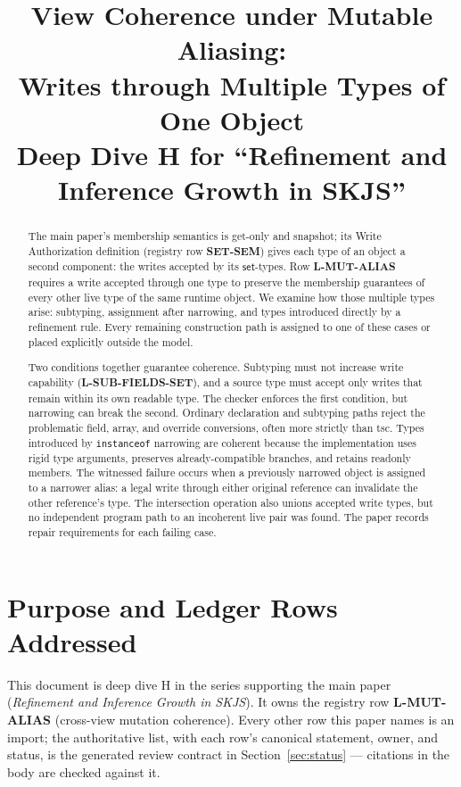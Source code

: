 \documentclass[11pt]{article}
\title{View Coherence under Mutable Aliasing:\\
Writes through Multiple Types of One Object\\
{\large Deep Dive H for ``Refinement and Inference Growth in SKJS''}}
\author{}
\date{\skjspin}
\begin{document}
\maketitle

\begin{abstract}
The main paper's membership semantics is get-only and snapshot; its
Write Authorization definition (registry row \textbf{SET-SEM}) gives
each type of an object a second component: the writes accepted by its
$\mathsf{set}$-types. Row \textbf{L-MUT-ALIAS} requires a write accepted
through one type to preserve the membership guarantees of every other live
type of the same runtime object. We examine how those multiple types arise:
subtyping, assignment after narrowing, and types introduced directly by a
refinement rule. Every remaining construction path is assigned to one of
these cases or placed explicitly outside the model.

Two conditions together guarantee coherence. Subtyping must not increase
write capability (\textbf{L-SUB-FIELDS-SET}), and a source type must accept
only writes that remain within its own readable type. The checker enforces the
first condition, but narrowing can break the second. Ordinary declaration and
subtyping paths reject the problematic field, array, and override conversions,
often more strictly than tsc. Types introduced by \texttt{instanceof}
narrowing are coherent because the implementation uses rigid type arguments,
preserves already-compatible branches, and retains readonly members. The
witnessed failure occurs when a previously narrowed object is assigned to a
narrower alias: a legal write through either original reference can invalidate
the other reference's type. The intersection operation also unions accepted
write types, but no independent program path to an incoherent live pair was
found. The paper records repair requirements for each failing case.
\end{abstract}

\tableofcontents

\section{Purpose and Ledger Rows Addressed}
\label{sec:purpose}

This document is deep dive H in the series supporting the main paper
(\emph{Refinement and Inference Growth in SKJS}). It owns the registry row \textbf{L-MUT-ALIAS} (cross-view mutation
coherence). Every other row this paper names is an import; the
authoritative list, with each row's canonical statement, owner, and
status, is the generated review contract in
Section~\ref{sec:status} — citations in the body are checked against
it.
\end{document}
